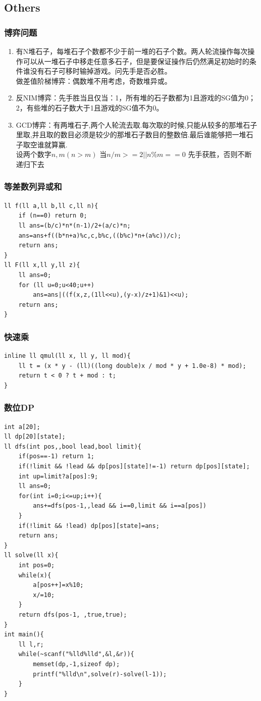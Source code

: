 \documentclass[twoside]{article}
\begin{document}
\subsection{Others}
\subsubsection{博弈问题}
\begin{enumerate}
\item 有N堆石子，每堆石子个数都不少于前一堆的石子个数。两人轮流操作每次操作可以从一堆石子中移走任意多石子，但是要保证操作后仍然满足初始时的条件谁没有石子可移时输掉游戏。问先手是否必胜。\\
做差值阶梯博弈：偶数堆不用考虑，奇数堆异或。
\item 反NIM博弈：先手胜当且仅当：1，所有堆的石子数都为1且游戏的SG值为0；2，有些堆的石子数大于1且游戏的SG值不为0。
\item GCD博弈：有两堆石子,两个人轮流去取.每次取的时候,只能从较多的那堆石子里取,并且取的数目必须是较少的那堆石子数目的整数倍.最后谁能够把一堆石子取空谁就算赢. \\
设两个数字$n,m(n>m)$ 当$n/m>=2||n\% m==0$ 先手获胜，否则不断递归下去
\end{enumerate}\subsubsection{等差数列异或和}
\begin{lstlisting}
ll f(ll a,ll b,ll c,ll n){
    if (n==0) return 0;
    ll ans=(b/c)*n*(n-1)/2+(a/c)*n;
    ans=ans+f((b*n+a)%c,c,b%c,((b%c)*n+(a%c))/c);
    return ans;
}
ll F(ll x,ll y,ll z){
    ll ans=0;
    for (ll u=0;u<40;u++)
        ans=ans|((f(x,z,(1ll<<u),(y-x)/z+1)&1)<<u); 
    return ans;
}\end{lstlisting}
\subsubsection{快速乘}
\begin{lstlisting}
inline ll qmul(ll x, ll y, ll mod){
    ll t = (x * y - (ll)((long double)x / mod * y + 1.0e-8) * mod);
    return t < 0 ? t + mod : t;
}\end{lstlisting}
\subsubsection{数位DP}
\begin{lstlisting}
int a[20];
ll dp[20][state];
ll dfs(int pos,,bool lead,bool limit){
    if(pos==-1) return 1;
    if(!limit && !lead && dp[pos][state]!=-1) return dp[pos][state];
    int up=limit?a[pos]:9;
    ll ans=0;
    for(int i=0;i<=up;i++){
        ans+=dfs(pos-1,,lead && i==0,limit && i==a[pos])
    }
    if(!limit && !lead) dp[pos][state]=ans;
    return ans;
}
ll solve(ll x){
    int pos=0;
    while(x){
        a[pos++]=x%10;
        x/=10;
    }
    return dfs(pos-1, ,true,true);
}
int main(){
    ll l,r;
    while(~scanf("%lld%lld",&l,&r)){
        memset(dp,-1,sizeof dp);
        printf("%lld\n",solve(r)-solve(l-1));
    }
}
\end{lstlisting}
\end{document}
